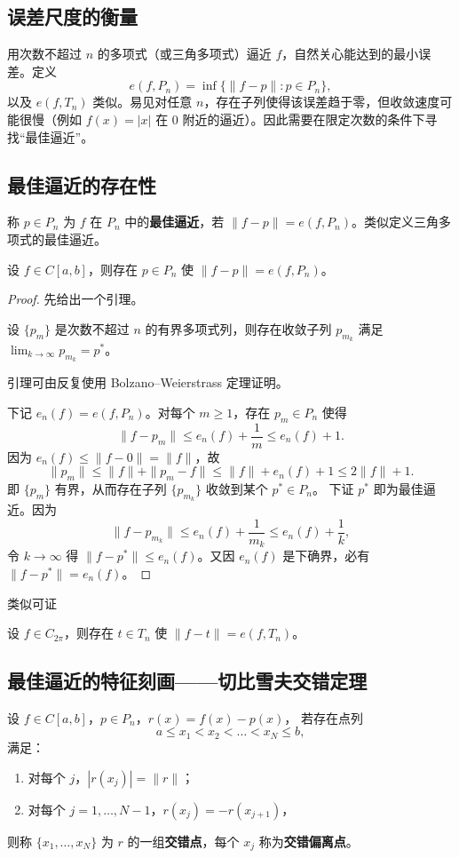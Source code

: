 \subsection{误差尺度的衡量}
用次数不超过 $n$ 的多项式（或三角多项式）逼近 $f$，自然关心能达到的最小误差。定义
\[
e(f,P_n) = \inf\{\|f-p\| : p\in P_n\},
\]
以及 $e(f,T_n)$ 类似。易见对任意 $n$，存在子列使得该误差趋于零，但收敛速度可能很慢（例如 $f(x)=|x|$ 在 $0$ 附近的逼近）。因此需要在限定次数的条件下寻找“最佳逼近”。

\subsection{最佳逼近的存在性}
\begin{definition}
称 $p\in P_n$ 为 $f$ 在 $P_n$ 中的\textbf{最佳逼近}，若 $\|f-p\| = e(f,P_n)$。类似定义三角多项式的最佳逼近。
\end{definition}

\begin{theorem}
设 $f\in C[a,b]$，则存在 $p\in P_n$ 使 $\|f-p\| = e(f,P_n)$。
\end{theorem}
\begin{proof}
先给出一个引理。
\begin{lemma}
设 $\{p_m\}$ 是次数不超过 $n$ 的有界多项式列，则存在收敛子列 $p_{m_k}$ 满足 $\lim_{k\to\infty} p_{m_k} = p^*$。
\end{lemma}
引理可由反复使用 Bolzano–Weierstrass 定理证明。

下记 $e_n(f)=e(f,P_n)$。对每个 $m\ge1$，存在 $p_m\in P_n$ 使得
\[
\|f-p_m\|  \leqslant  e_n(f) + \frac1m  \leqslant  e_n(f)+1.
\]
因为 $e_n(f) \leqslant  \|f-0\| = \|f\|$，故
\[
\|p_m\|  \leqslant  \|f\| + \|p_m-f\|  \leqslant \|f\| + e_n(f)+1  \leqslant 2\|f\|+1.
\]
即 $\{p_m\}$ 有界，从而存在子列 $\{p_{m_k}\}$ 收敛到某个 $p^*\in P_n$。
下证 $p^*$ 即为最佳逼近。因为
\[
\|f-p_{m_k}\|  \leqslant e_n(f) + \frac1{m_k}  \leqslant e_n(f) + \frac1k,
\]
令 $k\to\infty$ 得 $\|f-p^*\| \leqslant e_n(f)$。又因 $e_n(f)$ 是下确界，必有 $\|f-p^*\| = e_n(f)$。
\end{proof}

类似可证
\begin{theorem}
设 $f\in C_{2\pi}$，则存在 $t\in T_n$ 使 $\|f-t\| = e(f,T_n)$。
\end{theorem}

\subsection{最佳逼近的特征刻画——切比雪夫交错定理}
\begin{definition}[交错偏离点]
设 $f\in C[a,b]$，$p\in P_n$，$r(x)=f(x)-p(x)$，
若存在点列
\[
a \leqslant  x_1 < x_2 < \dots < x_N  \leqslant  b,
\]
满足：
\begin{enumerate}
    \item 对每个 $j$，$|r(x_j)| = \|r\| $；
    \item 对每个 $j=1,\dots,N-1$，$r(x_j) = -r(x_{j+1})$，
\end{enumerate}
则称 $\{x_1,\dots,x_N\}$ 为 $r$ 的一组\textbf{交错点}，每个 $x_j$ 称为\textbf{交错偏离点}。
\end{definition}

